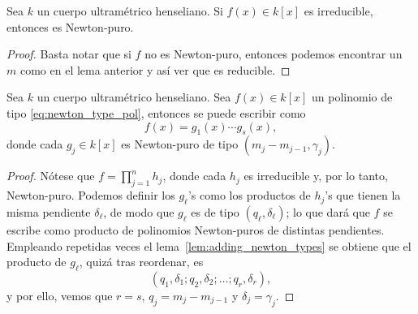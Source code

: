 \documentclass[teoria-numeros.tex]{subfiles}
\begin{document}
\begin{cor}\label{thm:irred_implies_pure}
	Sea $k$ un cuerpo ultramétrico henseliano.
	Si $f(x) \in k[x]$ es irreducible, entonces es Newton-puro.
\end{cor}
\begin{proof}
	Basta notar que si $f$ no es Newton-puro, entonces podemos encontrar un $m$ como en el lema anterior y así ver que es reducible.
\end{proof}

\begin{thm}\label{thm:newton_polygon}
	Sea $k$ un cuerpo ultramétrico henseliano.
	Sea $f(x) \in k[x]$ un polinomio de tipo \eqref{eq:newton_type_pol}, entonces se puede escribir como
	$$ f(x) = g_1(x) \cdots g_s(x), $$
	donde cada $g_j \in k[x]$ es Newton-puro de tipo $(m_j - m_{j-1}, \gamma_j)$.
\end{thm}
\begin{proof}
	Nótese que $f = \prod_{j=1}^{n} h_j$, donde cada $h_j$ es irreducible y, por lo tanto, Newton-puro.
	Podemos definir los $g_\ell$'s como los productos de $h_j$'s que tienen la misma pendiente $\delta_\ell$, de modo que $g_\ell$
	es de tipo $(q_\ell, \delta_\ell)$; lo que dará que $f$ se escribe como producto de polinomios Newton-puros de distintas pendientes.
	Empleando repetidas veces el lema~\ref{lem:adding_newton_types} se obtiene que el producto de $g_\ell$, quizá tras reordenar, es
	$$ (q_1, \delta_1; q_2, \delta_2; \dots; q_r, \delta_r), $$
	y por ello, vemos que $r = s$, $q_j = m_j - m_{j-1}$ y $\delta_j = \gamma_j$.
\end{proof}
\end{document}
